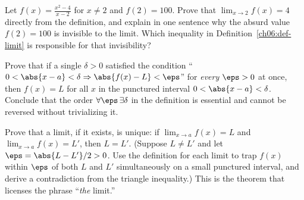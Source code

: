 \begin{exercise}
Let $\displaystyle f(x)=\frac{x^2-4}{x-2}$ for $x\ne2$ and $f(2)=100$. Prove that
$\lim_{x\to2}f(x)=4$ directly from the definition, and explain in one sentence
why the absurd value $f(2)=100$ is invisible to the limit. Which inequality in
Definition~\ref{ch06:def-limit} is responsible for that invisibility?
\end{exercise}

\begin{exercise}
Prove that if a single $\delta>0$ satisfied the condition
``$0<\abs{x-a}<\delta\Rightarrow\abs{f(x)-L}<\eps$'' for \emph{every} $\eps>0$
at once, then $f(x)=L$ for all $x$ in the punctured interval $0<\abs{x-a}<\delta$.
Conclude that the order $\forall\eps\,\exists\delta$ in the definition is
essential and cannot be reversed without trivializing it.
\end{exercise}

\begin{exercise}
Prove that a limit, if it exists, is unique: if $\lim_{x\to a}f(x)=L$ and
$\lim_{x\to a}f(x)=L'$, then $L=L'$. (Suppose $L\ne L'$ and let
$\eps=\abs{L-L'}/2>0$. Use the definition for each limit to trap $f(x)$ within
$\eps$ of both $L$ and $L'$ simultaneously on a small punctured interval, and
derive a contradiction from the triangle inequality.) This is the theorem that
licenses the phrase ``\emph{the} limit.''
\end{exercise}
